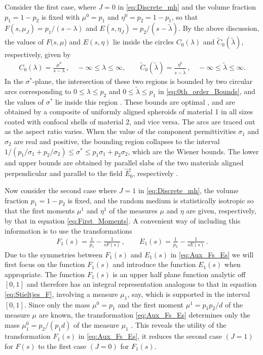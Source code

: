 \documentclass{cmslatex}
\begin{document}
Consider the first case, where $J=0$  in \eqref{eq:Discrete_mh} and the
volume fraction $p_1=1-p_2$ is fixed with $\mu^0=p_1$ and
$\eta^0=p_2=1-p_1$, so that $F(s,\mu_J)=p_1/(s-\lambda)$ and
$E(s,\eta_J)=p_2/(s-\tilde{\lambda})$. By the above discussion, the values of 
$F(s,\mu$) and $E(s,\eta)$ lie inside the circles $C_0(\lambda)$ and
$\tilde{C}_0(\tilde{\lambda})$, respectively, given by  
%
\begin{align}\label{eq:0th_order_Bounds}
    C_0(\lambda)=\frac{\mu^0}{s-\lambda}\,, \quad -\infty\leq\lambda\leq \infty, \qquad
    \tilde{C}_0(\tilde{\lambda})=\frac{\eta^0}{s-\tilde{\lambda}}\,, \quad
    -\infty\leq\tilde{\lambda}\leq \infty. 
\end{align}
%
In the $\sigma^*$-plane, the intersection of these two regions is bounded by
two circular arcs corresponding to $0\leq\lambda\leq p_2$ and $0\leq\tilde{\lambda}\leq p_1$
in \eqref{eq:0th_order_Bounds}, and the values of $\sigma^*$ lie inside
this region \cite{Golden:JMPS-333}. These bounds are optimal
\cite{Milton:JAP-5286,Bergman:AP-78}, and are obtained by a composite
of uniformly aligned spheroids of material 1 in all sizes coated with
confocal shells of material 2, and vice versa. The arcs are traced out
as the aspect ratio varies. When the value of the component
permittivities $\sigma_1$ and $\sigma_2$ are real and positive, the bounding
region collapses to the interval
$1/(p_1/\sigma_1+p_2/\sigma_2)\leq\sigma^*\leq p_1\sigma_1+p_2\sigma_2$, which are the Wiener
bounds. The lower and upper bounds are obtained by parallel slabs of
the two materials aligned perpendicular and parallel to the field
$\vec{E}_0$, respectively \cite{Scaife-1989}.



Now consider the second case where $J=1$ in \eqref{eq:Discrete_mh},
the volume fraction $p_1=1-p_2$ is fixed, and the random medium is
statistically isotropic so that the first moments $\mu^1$ and $\eta^1$ of
the measures $\mu$ and $\eta$ are given, respectively, by that in equation  
\eqref{eq:First_Moments}.  A convenient way of including this
information is to use the transformations \cite{Bergman:AP-78}
%
\begin{align}\label{eq:Aux_Fs_Es}
  F_1(s)=\frac{1}{p_1}-\frac{1}{sF(s)}\,, \qquad
  E_1(s)=\frac{1}{p_2}-\frac{1}{sE(s)}\,.
\end{align}
%
Due to the symmetries between $F_1(s)$ and $E_1(s)$ in
\eqref{eq:Aux_Fs_Es} we will first focus on the function $F_1(s)$ and
introduce the function $E_1(s)$ when appropriate. The function
$F_1(s)$ is an upper half plane function analytic off $[0,1]$ and
therefore has an integral representation
\cite{Bergman:AP-78,Golden:JMPS-333} analogous to that in equation
\eqref{eq:Stieltjes_F}, involving a
measure $\mu_1$, say, which is supported in the interval $[0,1]$. Since
only the mass $\mu^0=p_1$ and the first moment $\mu^1=p_1p_2/d$ of the
measure $\mu$ are known, the transformation \eqref{eq:Aux_Fs_Es}
determines only the mass $\mu_1^0=p_2/(p_1d)$ of the measure $\mu_1$
\cite{Bergman:AP-78,Golden:JMPS-333}. This reveals the utility of the
transformation $F_1(s)$ in \eqref{eq:Aux_Fs_Es}, it reduces the second
case $(J=1)$ for $F(s)$ to the first case $(J=0)$ for $F_1(s)$.
\end{document}
